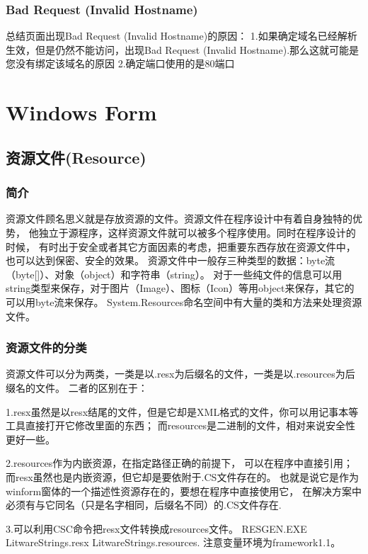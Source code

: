 \documentclass{book}
\begin{document}
\subsection{Bad Request (Invalid Hostname)}

总结页面出现Bad Request (Invalid Hostname)的原因：
1.如果确定域名已经解析生效，但是仍然不能访问，出现Bad Request (Invalid Hostname).那么这就可能是您没有绑定该域名的原因
2.确定端口使用的是80端口

\chapter{Windows Form}

\section{资源文件(Resource)}

\subsection{简介}

资源文件顾名思义就是存放资源的文件。资源文件在程序设计中有着自身独特的优势，
他独立于源程序，这样资源文件就可以被多个程序使用。同时在程序设计的时候，
有时出于安全或者其它方面因素的考虑，把重要东西存放在资源文件中，也可以达到保密、安全的效果。
资源文件中一般存三种类型的数据：byte流（byte[]）、对象（object）和字符串（string）。
对于一些纯文件的信息可以用string类型来保存，对于图片（Image）、图标（Icon）等用object来保存，其它的可以用byte流来保存。
System.Resources命名空间中有大量的类和方法来处理资源文件。

\subsection{资源文件的分类}

资源文件可以分为两类，一类是以.resx为后缀名的文件，一类是以.resources为后缀名的文件。
二者的区别在于：

1.resx虽然是以resx结尾的文件，但是它却是XML格式的文件，你可以用记事本等工具直接打开它修改里面的东西；
而resources是二进制的文件，相对来说安全性更好一些。

2.resources作为内嵌资源，在指定路径正确的前提下，
可以在程序中直接引用；而resx虽然也是内嵌资源，但它却是要依附于.CS文件存在的。
也就是说它是作为winform窗体的一个描述性资源存在的，要想在程序中直接使用它，
在解决方案中必须有与它同名（只是名字相同，后缀名不同）的.CS文件存在.

3.可以利用CSC命令把resx文件转换成resources文件。
RESGEN.EXE LitwareStrings.resx LitwareStrings.resources.
注意变量环境为framework1.1。
\end{document}

